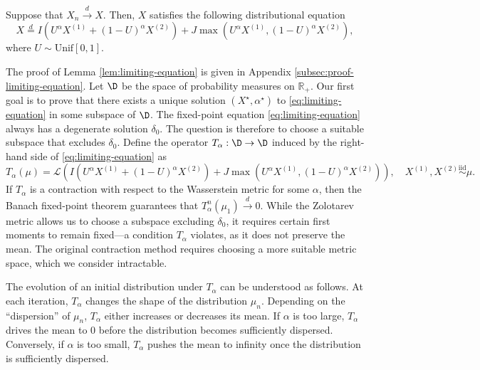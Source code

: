         \begin{lemma}
          \label{lem:limiting-equation}
          Suppose that $X_n \stackrel{d}{\to} X$. Then, $X$ satisfies the following distributional equation
          \begin{equation}
            \label{eq:limiting-equation}
            X \stackrel{d}{=} I\left(U^\alpha X^{(1)} + (1-U)^\alpha X^{(2)}\right) + J\max(U^\alpha X^{(1)}, (1-U)^\alpha X^{(2)}),
          \end{equation}
          where $U \sim \mathrm{Unif}[0,1]$.
        \end{lemma}

        The proof of Lemma \ref{lem:limiting-equation} is given in Appendix \ref{subsec:proof-limiting-equation}. Let $\D$ be the space of probability measures on $\mathbb{R}_+$. Our first goal is to prove that there exists a unique solution $(X^\star,\alpha^\star)$ to \eqref{eq:limiting-equation} in some subspace of $\D$. The fixed-point equation \eqref{eq:limiting-equation} always has a degenerate solution $\delta_0$. The question is therefore to choose a suitable subspace that excludes $\delta_0$. Define the operator $T_\alpha: \D \to \D$ induced by the right-hand side of \eqref{eq:limiting-equation} as
        \begin{equation}
          \label{eq:operator-T}
          T_{\alpha}(\mu) = \mathcal{L}\left(I\left(U^\alpha X^{(1)} + (1-U)^\alpha X^{(2)}\right) + J\max(U^\alpha X^{(1)}, (1-U)^\alpha X^{(2)})\right), \quad X^{(1)}, X^{(2)} \stackrel{\text{iid}}{\sim}\mu.
        \end{equation}
        If $T_\alpha$ is a contraction with respect to the Wasserstein metric for some $\alpha$, then the Banach fixed-point theorem guarantees that $T^n_\alpha(\mu_1) \xrightarrow{d} 0$. While the Zolotarev metric \cite{zolotarev1977approximation} allows us to choose a subspace excluding $\delta_0$, it requires certain first moments to remain fixed---a condition $T_\alpha$ violates, as it does not preserve the mean. The original contraction method requires choosing a more suitable metric space, which we consider intractable.

        The evolution of an initial distribution under $T_\alpha$ can be understood as follows. At each iteration, $T_\alpha$ changes the shape of the distribution $\mu_n$. Depending on the ``dispersion'' of $\mu_n$, $T_\alpha$ either increases or decreases its mean. If $\alpha$ is too large, $T_\alpha$ drives the mean to $0$ before the distribution becomes sufficiently dispersed. Conversely, if $\alpha$ is too small, $T_\alpha$ pushes the mean to infinity once the distribution is sufficiently dispersed.


